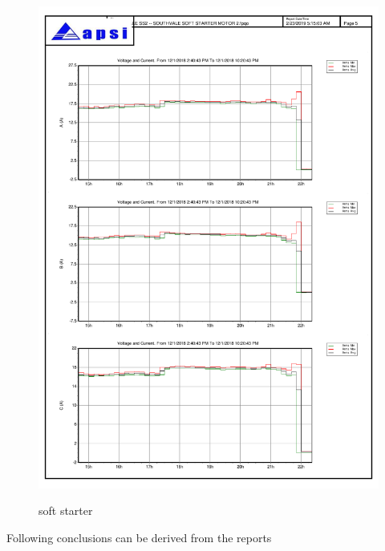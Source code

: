 \begin{figure}
	\includegraphics[width=\textwidth]{figures/fig_ch04_elecaudit_load_flow_softstarter.pdf} \\
	\caption{soft starter}
	\label{fig_ch04_elecaudit_load_flow_softstarter} 
\end{figure}

Following conclusions can be derived from the reports

